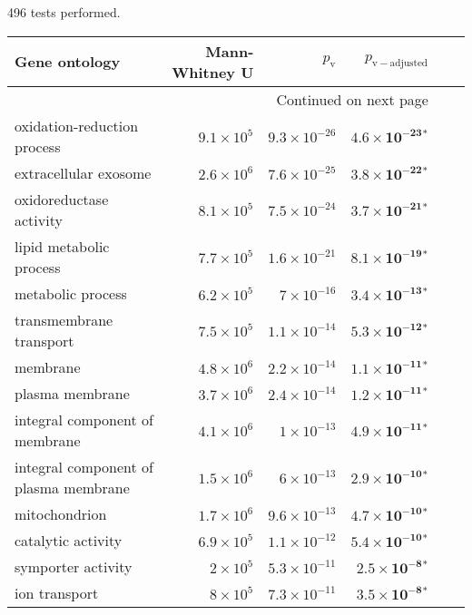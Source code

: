 \documentclass{article}
\begin{document}
496 tests performed.\scriptsize
\begin{longtable}{|l|r|r|r|r|r|}
\toprule
                             Gene ontology &     Mann-Whitney U &     $p_{\mathrm{v}}$ &      $p_{\mathrm{v-adjusted}}$ \\
\midrule
\endhead
\midrule
\multicolumn{4}{r}{{Continued on next page}} \\
\midrule
\endfoot

\bottomrule
\endlastfoot
               oxidation-reduction process & $9.1\times 10^{5}$ & $9.3\times 10^{-26}$ &  $\bm{4.6\times 10^{-23}{^*}}$ \\
                     extracellular exosome & $2.6\times 10^{6}$ & $7.6\times 10^{-25}$ &  $\bm{3.8\times 10^{-22}{^*}}$ \\
                   oxidoreductase activity & $8.1\times 10^{5}$ & $7.5\times 10^{-24}$ &  $\bm{3.7\times 10^{-21}{^*}}$ \\
                   lipid metabolic process & $7.7\times 10^{5}$ & $1.6\times 10^{-21}$ &  $\bm{8.1\times 10^{-19}{^*}}$ \\
                         metabolic process & $6.2\times 10^{5}$ &  $ 7\times 10^{-16}$ &  $\bm{3.4\times 10^{-13}{^*}}$ \\
                   transmembrane transport & $7.5\times 10^{5}$ & $1.1\times 10^{-14}$ &  $\bm{5.3\times 10^{-12}{^*}}$ \\
                                  membrane & $4.8\times 10^{6}$ & $2.2\times 10^{-14}$ &  $\bm{1.1\times 10^{-11}{^*}}$ \\
                           plasma membrane & $3.7\times 10^{6}$ & $2.4\times 10^{-14}$ &  $\bm{1.2\times 10^{-11}{^*}}$ \\
            integral component of membrane & $4.1\times 10^{6}$ &  $ 1\times 10^{-13}$ &  $\bm{4.9\times 10^{-11}{^*}}$ \\
     integral component of plasma membrane & $1.5\times 10^{6}$ &  $ 6\times 10^{-13}$ &  $\bm{2.9\times 10^{-10}{^*}}$ \\
                             mitochondrion & $1.7\times 10^{6}$ & $9.6\times 10^{-13}$ &  $\bm{4.7\times 10^{-10}{^*}}$ \\
                        catalytic activity & $6.9\times 10^{5}$ & $1.1\times 10^{-12}$ &  $\bm{5.4\times 10^{-10}{^*}}$ \\
                        symporter activity &  $ 2\times 10^{5}$ & $5.3\times 10^{-11}$ &   $\bm{2.5\times 10^{-8}{^*}}$ \\
                             ion transport &  $ 8\times 10^{5}$ & $7.3\times 10^{-11}$ &   $\bm{3.5\times 10^{-8}{^*}}$ \\

\end{longtable}
\end{document}
